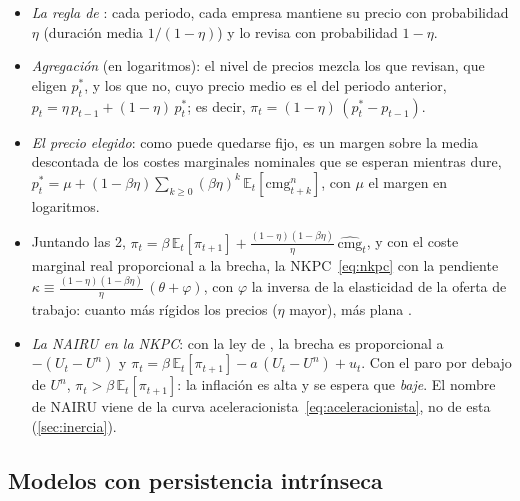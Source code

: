 \documentclass[11pt]{article}
\begin{document}
\begin{itemize}
\item \emph{La regla de }: cada periodo, cada empresa mantiene su precio con probabilidad $\eta$ (duración media $1/(1-\eta)$) y lo revisa con probabilidad $1-\eta$.
\item \emph{Agregación} (en logaritmos): el nivel de precios mezcla los que revisan, que eligen $p^*_t$, y los que no, cuyo precio medio es el del periodo anterior, $p_t=\eta\,p_{t-1}+(1-\eta)\,p^*_t$; es decir, $\pi_t=(1-\eta)\,(p^*_t-p_{t-1})$.
\item \emph{El precio elegido}: como puede quedarse fijo, es un margen sobre la media descontada de los costes marginales nominales que se esperan mientras dure, $p^*_t=\mu+(1-\beta\eta)\sum_{k\geq0}(\beta\eta)^k\,\mathbb{E}_t[\mathrm{cmg}^n_{t+k}]$, con $\mu$ el margen en logaritmos.
\item Juntando las 2\nocite{Gali2015Monetary}, $\pi_t=\beta\,\mathbb{E}_t[\pi_{t+1}]+\frac{(1-\eta)(1-\beta\eta)}{\eta}\,\widehat{\mathrm{cmg}}_t$, y con el coste marginal real proporcional a la brecha, la NKPC~\eqref{eq:nkpc} con la pendiente $\kappa\equiv\frac{(1-\eta)(1-\beta\eta)}{\eta}\,(\theta+\varphi)$, con $\varphi$ la inversa de la elasticidad de la oferta de trabajo: cuanto más rígidos los precios ($\eta$ mayor), más plana .
\item \emph{La NAIRU en la NKPC}: con la ley de , la brecha es proporcional a $-(U_t-U^n)$ y $\pi_t=\beta\,\mathbb{E}_t[\pi_{t+1}]-a\,(U_t-U^n)+u_t$. Con el paro por debajo de $U^n$, $\pi_t>\beta\,\mathbb{E}_t[\pi_{t+1}]$: la inflación es alta y se espera que \emph{baje}\nocite{Mankiw2001Inexorable}. El nombre de NAIRU viene de la curva aceleracionista~\eqref{eq:aceleracionista}, no de esta (\ref{sec:inercia}).
\end{itemize}

\subsection{Modelos con persistencia intrínseca}\label{anexo:persistencia-modelos}
\end{document}
